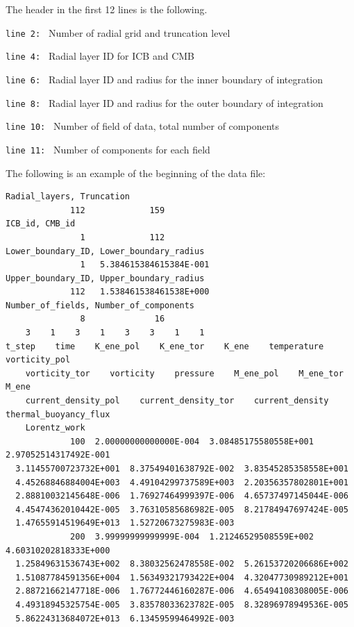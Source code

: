 The header in the first 12 lines is the following. 
%
\begin{description}
\item{\tt  line 2: } Number of radial grid and truncation level
\item{\tt  line 4: } Radial layer ID for ICB and CMB
\item{\tt  line 6: } Radial layer ID and radius for the inner boundary of integration
\item{\tt  line 8: } Radial layer ID and radius for the outer boundary of integration
\item{\tt  line 10: } Number of field of data, total number of components
\item{\tt  line 11: } Number of components for each field
\end{description}
%
The following is an example of the beginning of the data file:
{\scriptsize
\begin{verbatim}
Radial_layers, Truncation
             112             159
ICB_id, CMB_id
               1             112
Lower_boundary_ID, Lower_boundary_radius
               1   5.384615384615384E-001
Upper_boundary_ID, Upper_boundary_radius
             112   1.538461538461538E+000
Number_of_fields, Number_of_components
               8              16
    3    1    3    1    3    3    1    1
t_step    time    K_ene_pol    K_ene_tor    K_ene    temperature    vorticity_pol
    vorticity_tor    vorticity    pressure    M_ene_pol    M_ene_tor    M_ene
    current_density_pol    current_density_tor    current_density    thermal_buoyancy_flux
    Lorentz_work    
             100  2.00000000000000E-004  3.08485175580558E+001  2.97052514317492E-001
  3.11455700723732E+001  8.37549401638792E-002  3.83545285358558E+001  
  4.45268846884004E+003  4.49104299737589E+003  2.20356357802801E+001  
  2.88810032145648E-006  1.76927464999397E-006  4.65737497145044E-006  
  4.45474362010442E-005  3.76310585686982E-005  8.21784947697424E-005  
  1.47655914519649E+013  1.52720673275983E-003
             200  3.99999999999999E-004  1.21246529508559E+002  4.60310202818333E+000  
  1.25849631536743E+002  8.38032562478558E-002  5.26153720206686E+002  
  1.51087784591356E+004  1.56349321793422E+004  4.32047730989212E+001  
  2.88721662147718E-006  1.76772446160287E-006  4.65494108308005E-006  
  4.49318945325754E-005  3.83578033623782E-005  8.32896978949536E-005  
  5.86224313684072E+013  6.13459599464992E-003
\end{verbatim}
}
%
